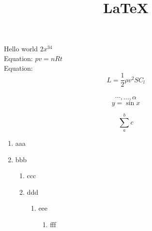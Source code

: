 \documentclass[11pt]{article}
\title{\LaTeX}
\author{}
\date{}
\begin{document}
\maketitle

Hello world $2x^{34}$\\

Equation: $pv=nRt$ \\

Equation: $$L=\frac{1}{2} \rho v^2 S C_l$$ \\
$$\cdots , \ldots , \alpha$$
$$y=\sin x$$

$$\sum_{a}^{b}{c}$$

\begin{enumerate}
\item aaa
\item bbb
	\begin{enumerate}
	\item ccc
	\item ddd
		\begin{enumerate}
		\item eee
			\begin{enumerate}
			\item fff
			\end{enumerate}
		\end{enumerate}
	\end{enumerate}
\end{enumerate}
\end{document}

